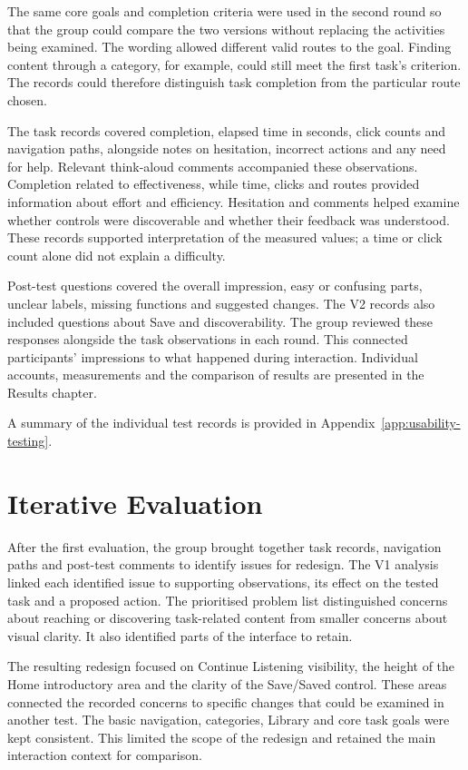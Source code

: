 The same core goals and completion criteria were used in the second round
so that the group could compare the two versions without replacing the
activities being examined. The wording allowed different valid routes to
the goal. Finding content through a category, for example, could still meet
the first task's criterion. The records could therefore distinguish task
completion from the particular route chosen.

The task records covered completion, elapsed time in seconds, click counts
and navigation paths, alongside notes on hesitation, incorrect actions and
any need for help. Relevant think-aloud comments accompanied these observations.
Completion related to effectiveness, while time, clicks and routes provided
information about effort and efficiency. Hesitation and comments helped
examine whether controls were discoverable and whether their feedback was
understood. These records supported interpretation of the measured values;
a time or click count alone did not explain a difficulty.

Post-test questions covered the overall impression, easy or confusing parts,
unclear labels, missing functions and suggested changes. The V2 records also
included questions about Save and discoverability. The group reviewed these
responses alongside the task observations in each round. This connected
participants' impressions to what happened during interaction. Individual
accounts, measurements and the comparison of results are presented in the
Results chapter.

A summary of the individual test records is provided in Appendix~\ref{app:usability-testing}.

\section{Iterative Evaluation}
\label{sec:method-iterative-evaluation}

After the first evaluation, the group brought together task records,
navigation paths and post-test comments to identify issues for redesign.
The V1 analysis linked each identified issue to supporting observations,
its effect on the tested task and a proposed action. The prioritised problem
list distinguished concerns about reaching or discovering task-related
content from smaller concerns about visual clarity. It also identified
parts of the interface to retain.

The resulting redesign focused on Continue Listening visibility, the height
of the Home introductory area and the clarity of the Save/Saved control.
These areas connected the recorded concerns to specific changes that could
be examined in another test. The basic navigation, categories, Library and
core task goals were kept consistent. This limited the scope of the redesign
and retained the main interaction context for comparison.

